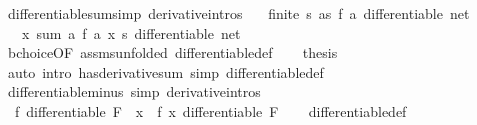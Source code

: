 \begin{isabellebody}
{\isafoldproof}%
%
\isadelimproof
\isanewline
%
\endisadelimproof
\isanewline
{}\isamarkupfalse%
\ differentiable{\isacharunderscore}{\kern0pt}sum{\isacharbrackleft}{\kern0pt}simp{\isacharcomma}{\kern0pt}\ derivative{\isacharunderscore}{\kern0pt}intros{\isacharbrackright}{\kern0pt}{\isacharcolon}{\kern0pt}\isanewline
\ \ \ {\isachardoublequoteopen}finite\ s{\isachardoublequoteclose}\ {\isachardoublequoteopen}{\isasymforall}a{\isasymin}s{\isachardot}{\kern0pt}\ {\isacharparenleft}{\kern0pt}f\ a{\isacharparenright}{\kern0pt}\ differentiable\ net{\isachardoublequoteclose}\isanewline
\ \ \ {\isachardoublequoteopen}{\isacharparenleft}{\kern0pt}{\isasymlambda}x{\isachardot}{\kern0pt}\ sum\ {\isacharparenleft}{\kern0pt}{\isasymlambda}a{\isachardot}{\kern0pt}\ f\ a\ x{\isacharparenright}{\kern0pt}\ s{\isacharparenright}{\kern0pt}\ differentiable\ net{\isachardoublequoteclose}\isanewline
%
\isadelimproof
%
\endisadelimproof
%
\isatagproof
{}\isamarkupfalse%
\ {\isacharminus}{\kern0pt}\isanewline
\ \ \isamarkupfalse%
\ bchoice{\isacharbrackleft}{\kern0pt}OF\ assms{\isacharparenleft}{\kern0pt}{}{\isacharparenright}{\kern0pt}{\isacharbrackleft}{\kern0pt}unfolded\ differentiable{\isacharunderscore}{\kern0pt}def{\isacharbrackright}{\kern0pt}{\isacharbrackright}{\kern0pt}\isanewline
\ \ \isamarkupfalse%
\ {\isacharquery}{\kern0pt}thesis\isanewline
\ \ \ \ \isamarkupfalse%
\ {\isacharparenleft}{\kern0pt}auto\ intro{\isacharbang}{\kern0pt}{\isacharcolon}{\kern0pt}\ has{\isacharunderscore}{\kern0pt}derivative{\isacharunderscore}{\kern0pt}sum\ simp{\isacharcolon}{\kern0pt}\ differentiable{\isacharunderscore}{\kern0pt}def{\isacharparenright}{\kern0pt}\isanewline
{}\isamarkupfalse%
%
\endisatagproof
{\isafoldproof}%
%
\isadelimproof
\isanewline
%
\endisadelimproof
\isanewline
{}\isamarkupfalse%
\ differentiable{\isacharunderscore}{\kern0pt}minus\ {\isacharbrackleft}{\kern0pt}simp{\isacharcomma}{\kern0pt}\ derivative{\isacharunderscore}{\kern0pt}intros{\isacharbrackright}{\kern0pt}{\isacharcolon}{\kern0pt}\isanewline
\ \ {\isachardoublequoteopen}f\ differentiable\ F\ {\isasymLongrightarrow}\ {\isacharparenleft}{\kern0pt}{\isasymlambda}x{\isachardot}{\kern0pt}\ {\isacharminus}{\kern0pt}\ f\ x{\isacharparenright}{\kern0pt}\ differentiable\ F{\isachardoublequoteclose}\isanewline
%
\isadelimproof
\ \ %
\endisadelimproof
%
\isatagproof
{}\isamarkupfalse%
\ differentiable{\isacharunderscore}{\kern0pt}def\ \isamarkupfalse%

\end{isabellebody}
